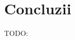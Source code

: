 \documentclass[12pt,a4paper]{report}
\newcommand{\worktype}[1]{[\textit{#1}] }
\newcommand{\dezvoltare}{\worktype{Dezvoltare de produs}}
\newcommand{\cercetare}{\worktype{Cercetare}}
\newcommand{\ambele}{\worktype{Ambele}}
\begin{document}
%

\chapter{Concluzii}
TODO:
%
%
%
\end{document}
